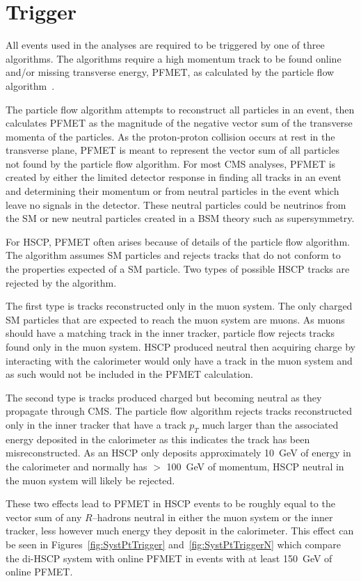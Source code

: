 \section{Trigger \label{sec:trigger}}
All events used in the analyses are required to be triggered by one of three algorithms. The algorithms require a high momentum track to be found online
and/or missing transverse energy, PFMET, as calculated by the particle flow algorithm~\cite{CMS:2010xta}. 

The particle flow algorithm attempts
to reconstruct all particles in an event, then calculates PFMET as the magnitude of the negative vector sum of the transverse momenta of the particles. 
As the proton-proton collision occurs
at rest in the transverse plane, PFMET is meant to represent the vector sum of all particles not found by the particle flow algorithm. For most CMS analyses, PFMET is created
by either the limited detector response in finding all tracks in an event and determining their momentum or from neutral particles in the event which leave no signals
in the detector. These neutral particles could be neutrinos from the SM or new neutral particles created in a BSM theory such as supersymmetry. 

For HSCP,
PFMET often arises because of details of the particle flow algorithm. The algorithm assumes SM particles and rejects tracks that do not conform to the properties expected
of a SM particle. Two types of possible HSCP tracks are rejected by the algorithm. 

The first type is tracks reconstructed only in the muon system. The only charged SM particles that
are expected to reach the muon system are muons. As muons should have a matching track in the inner tracker, particle flow rejects tracks found only in the
muon system. HSCP produced neutral then acquiring charge by interacting with the calorimeter
would only have a track in the muon system and as such would not be included in the PFMET calculation. 

The second type is tracks produced charged but becoming neutral as they propagate through CMS.
The particle flow algorithm rejects tracks reconstructed only in the inner tracker that have a track $p_T$ much larger
than the associated energy deposited in the calorimeter as this indicates the track has been misreconstructed.
As an HSCP only deposits approximately 10~GeV of energy in the calorimeter and normally has $>$ 100~GeV of momentum, HSCP neutral in the muon system will likely be rejected. 

These two effects lead to PFMET in HSCP events to be roughly equal to the vector sum of any $R$--hadrons neutral in
either the muon system or the inner tracker, less however much energy they deposit in the calorimeter. This effect can be seen in Figures~\ref{fig:SystPtTrigger} 
and~\ref{fig:SystPtTriggerN} which compare the di-HSCP system with online PFMET in events with at least 150~GeV of online PFMET.

